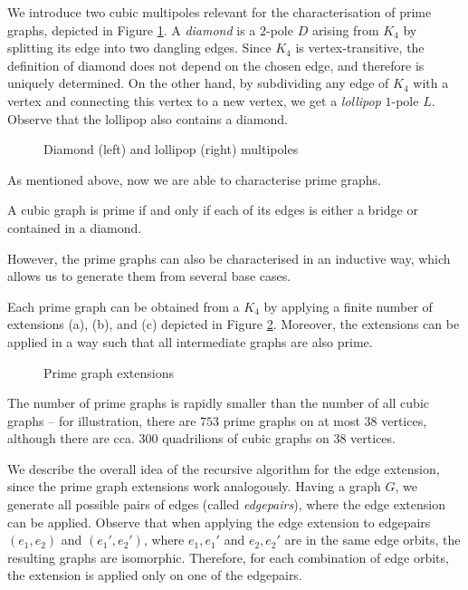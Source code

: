 We introduce two cubic multipoles relevant for the characterisation of prime graphs, depicted in Figure \ref{fig:diamond_lollipop}. A \emph{diamond} is a $2$-pole $D$ arising from $K_4$ by splitting its edge into two dangling edges. Since $K_4$ is vertex-transitive, the definition of diamond does not depend on the chosen edge, and therefore is uniquely determined. On the other hand, by subdividing any edge of $K_4$ with a vertex and connecting this vertex to a new vertex, we get a \emph{lollipop} $1$-pole $L$. Observe that the lollipop also contains a diamond.

\begin{figure}[h!]\centering
    
    \caption{Diamond (left) and lollipop (right) multipoles}
    \label{fig:diamond_lollipop}
\end{figure}

As mentioned above, now we are able to characterise prime graphs.

\begin{lemma}\emph{\cite[p. 70]{snarkhunter}}
    A cubic graph is prime if and only if each of its edges is either a bridge or contained in a diamond.
\end{lemma}

However, the prime graphs can also be characterised in an inductive way, which allows us to generate them from several base cases.

\begin{lemma}\emph{\cite[p. 70]{snarkhunter}}
    Each prime graph can be obtained from a $K_4$ by applying a finite number of extensions (a), (b), and (c) depicted in Figure \ref{fig:prime_reductions}. Moreover, the extensions can be applied in a way such that all intermediate graphs are also prime. \label{lem:prime_graphs_construction}
    \begin{figure}[h!]\centering
        
        \caption{Prime graph extensions}
        \label{fig:prime_reductions}
    \end{figure}
\end{lemma}

The number of prime graphs is rapidly smaller than the number of all cubic graphs -- for illustration, there are $753$ prime graphs on at most $38$ vertices, although there are cca. $300$ quadrilions of cubic graphs on $38$ vertices.

We describe the overall idea of the recursive algorithm for the edge extension, since the prime graph extensions work analogously. Having a graph $G$, we generate all possible pairs of edges (called \emph{edgepairs}), where the edge extension can be applied. Observe that when applying the edge extension to edgepairs $(e_1, e_2)$ and $(e_1', e_2')$, where $e_1, e_1'$ and $e_2, e_2'$ are in the same edge orbits, the resulting graphs are isomorphic. Therefore, for each combination of edge orbits, the extension is applied only on one of the edgepairs.

